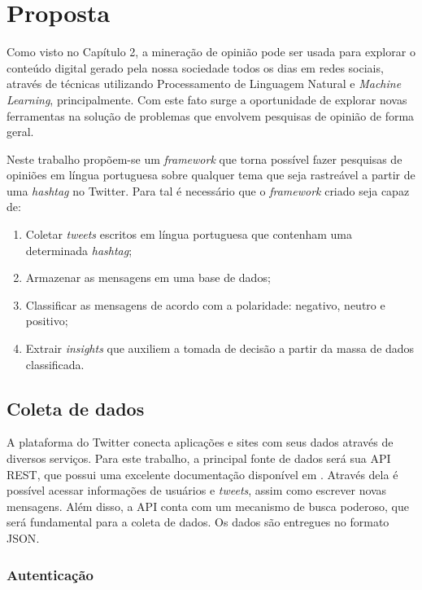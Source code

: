 \chapter{Proposta} \label{cap:proposta}

Como visto no Capítulo 2, a mineração de opinião pode ser usada para explorar o conteúdo digital gerado pela nossa sociedade todos os dias em redes sociais, através de técnicas utilizando Processamento de Linguagem Natural e \textit{Machine Learning}, principalmente. Com este fato surge a oportunidade de explorar novas ferramentas na
solução de problemas que envolvem pesquisas de opinião de forma geral.

Neste trabalho propõem-se um \textit{framework} que torna possível fazer pesquisas de opiniões em língua portuguesa sobre qualquer tema que seja rastreável a partir de uma \textit{hashtag} no Twitter.
Para tal é necessário que o \textit{framework} criado seja capaz de:

\begin{enumerate}
	\item Coletar \textit{tweets} escritos em língua portuguesa que contenham uma determinada \textit{hashtag};
	\item Armazenar as mensagens em uma base de dados;
	\item Classificar as mensagens de acordo com a polaridade: negativo, neutro e positivo;
	\item Extrair \textit{insights} que auxiliem a tomada de decisão a partir da massa de dados classificada.
\end{enumerate}

\section{Coleta de dados}
A plataforma do Twitter conecta aplicações e sites com seus dados através de diversos serviços. Para este trabalho, a principal fonte de dados será sua API REST, que possui uma excelente documentação disponível em \cite{twitterapidocs}. Através dela é possível acessar informações de usuários e \textit{tweets}, assim como escrever novas mensagens. Além disso, a API conta com um mecanismo de busca poderoso, que será fundamental para a coleta de dados. Os dados são entregues no formato \ac{JSON}.

\subsection{Autenticação}

